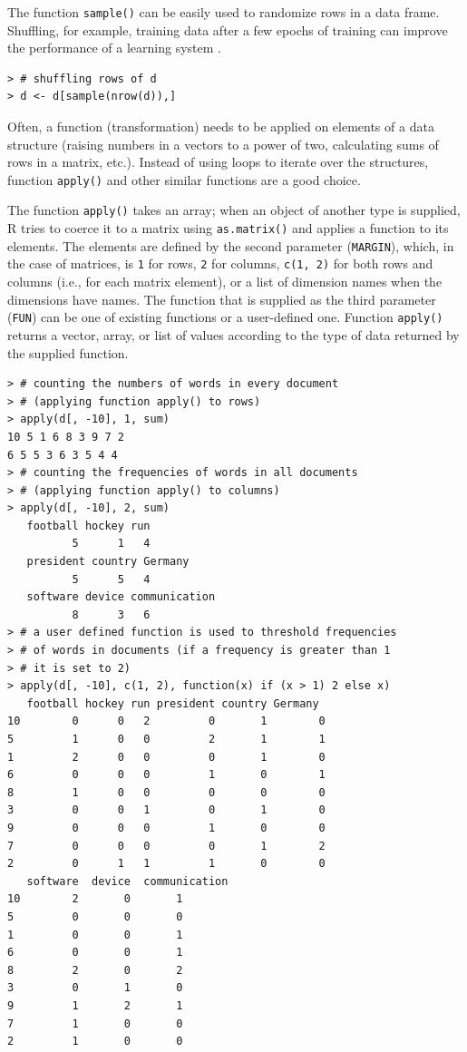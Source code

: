 The function \texttt{sample()} can be easily used to randomize rows in a data frame.
Shuffling, for example, training data after a few epochs of training can improve
the performance of a learning system \cite{ref51}.

\begin{verbatim}
> # shuffling rows of d
> d <- d[sample(nrow(d)),]
\end{verbatim}

Often, a function (transformation) needs to be applied on elements of a data
structure (raising numbers in a vectors to a power of two, calculating sums of
rows in a matrix, etc.). Instead of using loops to iterate over the structures, function \texttt{apply()} and other similar functions are a good choice.

The function \texttt{apply()} takes an array; when an object of another type is supplied, 
R tries to coerce it to a matrix using \texttt{as.matrix()} and applies a function 
to its elements. The elements are defined by the second parameter (\texttt{MARGIN}), 
which, in the case of matrices, is \texttt{1} for rows, \texttt{2} for columns, 
\texttt{c(1, 2)} for both rows and columns (i.e., for each matrix element), 
or a list of dimension names when the dimensions have names. 
The function that is supplied as the third parameter (\texttt{FUN}) can be one of 
existing functions or a user-defined one. 
Function \texttt{apply()} returns a vector, array, or list of values according 
to the type of data returned by the supplied function.

\begin{verbatim}
> # counting the numbers of words in every document
> # (applying function apply() to rows)
> apply(d[, -10], 1, sum)
10 5 1 6 8 3 9 7 2
6 5 5 3 6 3 5 4 4
> # counting the frequencies of words in all documents
> # (applying function apply() to columns)
> apply(d[, -10], 2, sum)
   football hockey run
          5      1   4
   president country Germany
          5      5   4
   software device communication
          8      3   6
> # a user defined function is used to threshold frequencies
> # of words in documents (if a frequency is greater than 1
> # it is set to 2)
> apply(d[, -10], c(1, 2), function(x) if (x > 1) 2 else x)
   football hockey run president country Germany
10        0      0   2         0       1        0
5         1      0   0         2       1        1
1         2      0   0         0       1        0
6         0      0   0         1       0        1
8         1      0   0         0       0        0
3         0      0   1         0       1        0
9         0      0   0         1       0        0
7         0      0   0         0       1        2
2         0      1   1         1       0        0
   software  device  communication
10        2       0       1
5         0       0       0
1         0       0       1
6         0       0       1
8         2       0       2
3         0       1       0
9         1       2       1
7         1       0       0
2         1       0       0
\end{verbatim}


